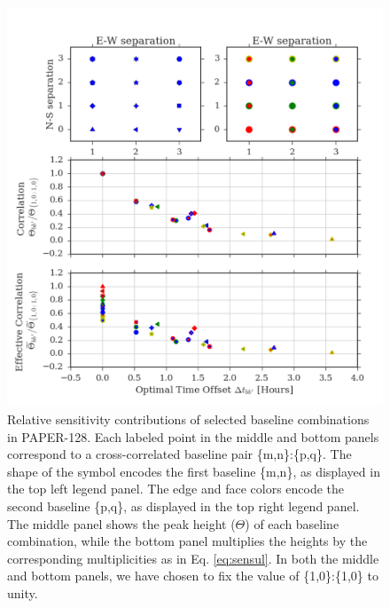 \documentclass[twocolumn,apj,numberedappendix]{emulateapj}
\renewcommand\[{\begin{equation}}
\renewcommand\]{\end{equation}}
\begin{document}
\begin{figure}[h!]
\includegraphics[width=\textwidth]{sensitivity_1}

\caption{Relative sensitivity contributions of selected baseline combinations in PAPER-128. Each labeled point in the middle and bottom panels correspond to a cross-correlated baseline pair \{m,n\}:\{p,q\}. The shape of the symbol encodes the first baseline \{m,n\}, as displayed in the top left legend panel. The edge and face colors encode the second baseline \{p,q\}, as displayed in the top right legend panel. The middle
panel shows the peak height ($\Theta$) of each baseline
combination, while the bottom panel multiplies the heights by the
corresponding multiplicities as in Eq. \eqref{eq:sensul}. 
In both the middle and bottom panels, we have chosen to fix the value  of \{1,0\}:\{1,0\} to unity.  }
\label{fig:sensplot}
\end{figure}
\end{document}
